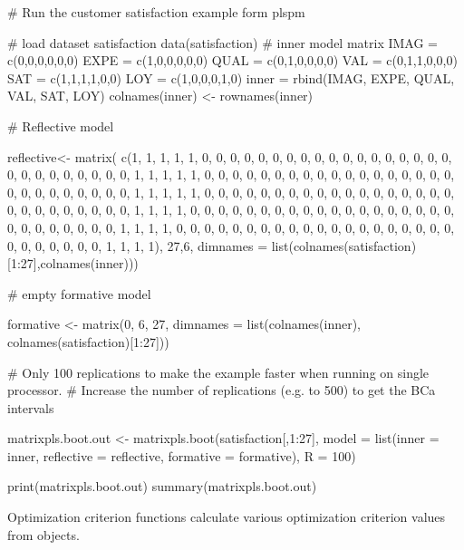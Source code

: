 \documentclass[a4paper]{book}
\begin{document}
\begin{Examples}
\begin{ExampleCode}
# Run the customer satisfaction example form plspm

# load dataset satisfaction
data(satisfaction)
# inner model matrix
IMAG = c(0,0,0,0,0,0)
EXPE = c(1,0,0,0,0,0)
QUAL = c(0,1,0,0,0,0)
VAL = c(0,1,1,0,0,0)
SAT = c(1,1,1,1,0,0)
LOY = c(1,0,0,0,1,0)
inner = rbind(IMAG, EXPE, QUAL, VAL, SAT, LOY)
colnames(inner) <- rownames(inner)

# Reflective model

reflective<- matrix(
  c(1, 1, 1, 1, 1, 0, 0, 0, 0, 0, 0, 0, 0, 0, 0, 0, 0, 0, 0, 0, 0, 0, 0, 0, 0, 0, 0,
    0, 0, 0, 0, 0, 1, 1, 1, 1, 1, 0, 0, 0, 0, 0, 0, 0, 0, 0, 0, 0, 0, 0, 0, 0, 0, 0,
    0, 0, 0, 0, 0, 0, 0, 0, 0, 0, 1, 1, 1, 1, 1, 0, 0, 0, 0, 0, 0, 0, 0, 0, 0, 0, 0,
    0, 0, 0, 0, 0, 0, 0, 0, 0, 0, 0, 0, 0, 0, 0, 1, 1, 1, 1, 0, 0, 0, 0, 0, 0, 0, 0,
    0, 0, 0, 0, 0, 0, 0, 0, 0, 0, 0, 0, 0, 0, 0, 0, 0, 0, 0, 1, 1, 1, 1, 0, 0, 0, 0,
    0, 0, 0, 0, 0, 0, 0, 0, 0, 0, 0, 0, 0, 0, 0, 0, 0, 0, 0, 0, 0, 0, 0, 1, 1, 1, 1),
  27,6, dimnames = list(colnames(satisfaction)[1:27],colnames(inner)))

# empty formative model

formative <- matrix(0, 6, 27, dimnames = list(colnames(inner),
                                              colnames(satisfaction)[1:27]))

# Only 100 replications to make the example faster when running on single processor. 
# Increase the number of replications (e.g. to 500) to get the BCa intervals

matrixpls.boot.out <- matrixpls.boot(satisfaction[,1:27],
                           model = list(inner = inner,
                                        reflective = reflective,
                                        formative = formative),
                           R = 100)

print(matrixpls.boot.out)
summary(matrixpls.boot.out)
\end{ExampleCode}
\end{Examples}
%
\begin{Description}\relax
Optimization criterion functions calculate various optimization criterion values
from  objects.
\end{Description}
\end{document}
